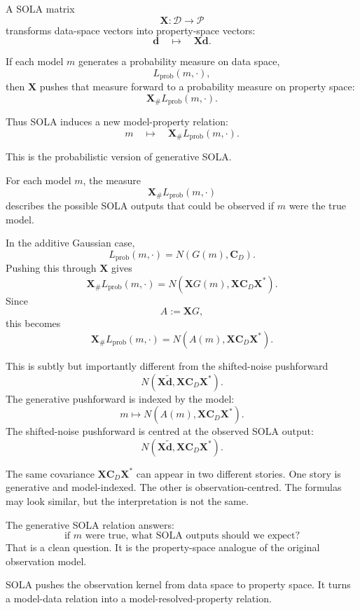 \documentclass[11pt,openany]{book}
\theoremstyle{definition}
\theoremstyle{remark}
\newcommand{\D}{\mathcal D}
\newcommand{\Pspace}{\mathcal P}
\begin{document}
A SOLA matrix
\[
  \mathbf X:\D\to\Pspace
\]
transforms data-space vectors into property-space vectors:
\[
  \mathbf d
  \quad\longmapsto\quad
  \mathbf X\mathbf d.
\]

If each model \(m\) generates a probability measure on data space,
\[
  L_{\mathrm{prob}}(m,\cdot),
\]
then \(\mathbf X\) pushes that measure forward to a probability measure on property space:
\[
  \mathbf X_{\#}L_{\mathrm{prob}}(m,\cdot).
\]

Thus SOLA induces a new model-property relation:
\[
  m
  \quad\longmapsto\quad
  \mathbf X_{\#}L_{\mathrm{prob}}(m,\cdot).
\]

This is the probabilistic version of generative SOLA.

For each model \(m\), the measure
\[
  \mathbf X_{\#}L_{\mathrm{prob}}(m,\cdot)
\]
describes the possible SOLA outputs that could be observed if \(m\) were the true model.

In the additive Gaussian case,
\[
  L_{\mathrm{prob}}(m,\cdot)
  =
  N(G(m),\mathbf C_D).
\]
Pushing this through \(\mathbf X\) gives
\[
  \mathbf X_{\#}L_{\mathrm{prob}}(m,\cdot)
  =
  N(\mathbf XG(m),\mathbf X\mathbf C_D\mathbf X^*).
\]
Since
\[
  A:=\mathbf XG,
\]
this becomes
\[
  \mathbf X_{\#}L_{\mathrm{prob}}(m,\cdot)
  =
  N(A(m),\mathbf X\mathbf C_D\mathbf X^*).
\]

This is subtly but importantly different from the shifted-noise pushforward
\[
  N(\mathbf X\widetilde{\mathbf d},\mathbf X\mathbf C_D\mathbf X^*).
\]
The generative pushforward is indexed by the model:
\[
  m\mapsto N(A(m),\mathbf X\mathbf C_D\mathbf X^*).
\]
The shifted-noise pushforward is centred at the observed SOLA output:
\[
  N(\mathbf X\widetilde{\mathbf d},\mathbf X\mathbf C_D\mathbf X^*).
\]

\begin{warningbox}
The same covariance \(\mathbf X\mathbf C_D\mathbf X^*\) can appear in two different stories.
One story is generative and model-indexed. The other is observation-centred. The formulas may
look similar, but the interpretation is not the same.
\end{warningbox}

The generative SOLA relation answers:
\[
  \text{if }m\text{ were true, what SOLA outputs should we expect?}
\]
That is a clean question. It is the property-space analogue of the original observation model.

\begin{lessonbox}
SOLA pushes the observation kernel from data space to property space. It turns a model-data
relation into a model-resolved-property relation.
\end{lessonbox}
\end{document}
